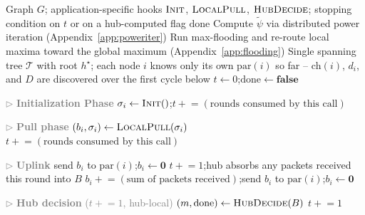\documentclass{article}
\newcommand{\merw}{EigenTree}
\begin{document}
\begin{algorithm}[H]
\caption{\merw{} (generic protocol)}
\label{alg:merw-generic}
\begin{algorithmic}[1]
\Require Graph $G$; application-specific hooks $\textsc{Init}$, $\textsc{LocalPull}$, $\textsc{HubDecide}$; stopping condition on $t$ or on a hub-computed flag $\mathrm{done}$
\State Compute $\tilde{\psi}$ via distributed power iteration (Appendix~\ref{app:poweriter})
\State Run max-flooding and re-route local maxima toward the global maximum (Appendix~\ref{app:flooding})
\State Single spanning tree $\mathcal{T}$ with root $h^\star$; each node $i$ knows only its own $\mathrm{par}(i)$ so far -- $\mathrm{ch}(i)$, $d_i$, and $D$ are discovered over the first cycle below
\State $t \leftarrow 0$;\quad $\mathrm{done} \leftarrow \textbf{false}$ 

\State \textcolor{gray}{$\triangleright$ \textbf{Initialization Phase}}
    \State $\sigma_i \leftarrow \textsc{Init}()$;\quad $t \mathrel{+}= (\text{rounds consumed by this call})$
\EndFor

\Repeat
    \State \textcolor{gray}{$\triangleright$ \textbf{Pull phase}}
        \State $(b_i, \sigma_i) \leftarrow \textsc{LocalPull}(\sigma_i)$
        \State $t \mathrel{+}= (\text{rounds consumed by this call})$
    \EndFor

    \State \textcolor{gray}{$\triangleright$ \textbf{Uplink}}
     send $b_i$ to $\mathrm{par}(i)$;\quad $b_i \leftarrow \mathbf{0}$ \EndFor
    \Repeat
        \State $t \mathrel{+}= 1$;\quad hub absorbs any packets received this round into $B$
                \State $b_i \mathrel{+}= (\text{sum of packets received})$;\quad send $b_i$ to $\mathrm{par}(i)$;\quad $b_i \leftarrow \mathbf{0}$ 
            \EndIf
        \EndFor

    \State \textcolor{gray}{$\triangleright$ \textbf{Hub decision} ($t \mathrel{+}= 1$, hub-local)}
    \State $(m, \mathrm{done}) \leftarrow \textsc{HubDecide}(B)$ 
    \State $t \mathrel{+}= 1$


\end{algorithmic}
\end{algorithm}
\end{document}
